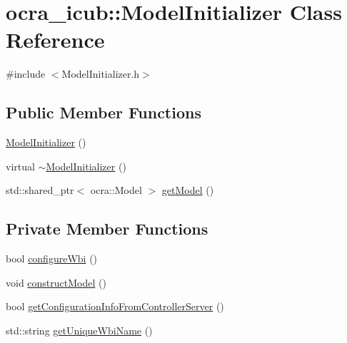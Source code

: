 \hypertarget{classocra__icub_1_1ModelInitializer}{\section{ocra\-\_\-icub\-:\-:\-Model\-Initializer \-Class \-Reference}
\label{classocra__icub_1_1ModelInitializer}
}


{\ttfamily \#include $<$\-Model\-Initializer.\-h$>$}

\subsection*{\-Public \-Member \-Functions}
\begin{DoxyCompactItemize}
\item 
\hyperlink{classocra__icub_1_1ModelInitializer_a14a314ebc05e38e472607b76951d31cc}{\-Model\-Initializer} ()
\item 
virtual \hyperlink{classocra__icub_1_1ModelInitializer_af72e47a78f20f34f77be2b9e6921ca19}{$\sim$\-Model\-Initializer} ()
\item 
std\-::shared\-\_\-ptr$<$ ocra\-::\-Model $>$ \hyperlink{classocra__icub_1_1ModelInitializer_aa8fbe9e7f20a2b4a29b6fce403c500c8}{get\-Model} ()
\end{DoxyCompactItemize}
\subsection*{\-Private \-Member \-Functions}
\begin{DoxyCompactItemize}
\item 
bool \hyperlink{classocra__icub_1_1ModelInitializer_afa7e888280149483f0ff27ced546801b}{configure\-Wbi} ()
\item 
void \hyperlink{classocra__icub_1_1ModelInitializer_a90747ff9773627f37ca9453491377b2c}{construct\-Model} ()
\item 
bool \hyperlink{classocra__icub_1_1ModelInitializer_abb762b28a1e7b57103f609c4fab4e94e}{get\-Configuration\-Info\-From\-Controller\-Server} ()
\item 
std\-::string \hyperlink{classocra__icub_1_1ModelInitializer_a086ea4822765ab6daff59fae1db0bd11}{get\-Unique\-Wbi\-Name} ()
\end{DoxyCompactItemize}
